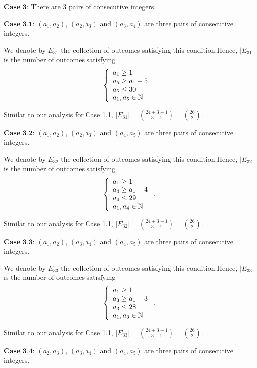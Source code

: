 \begin{enumerate}
 $\textbf{Case 3}$: There are 3 pairs of consecutive integers.

 $\textbf{Case 3.1}$: $\left( a_1 , a_2 \right)$, $\left( a_2 , a_3 \right)$ and $\left( a_3 , a_4 \right)$ are three pairs of consecutive integers.

 We denote by $E_{31}$ the collection of outcomes satisfying this condition.Hence, $| E_{31} |$ is the number of outcomes satisfying
 \[ \left\{ \begin{array}{l} a_1 \geq 1 \\ a_5 \geq a_1 + 5 \\ a_5 \leq 30 \\ a_1, a_5 \in \Bbb N \end{array} \right.. \]

 Similar to our analysis for Case 1.1,  $| E_{31} | = \binom{24 + 3 - 1}{3 - 1} = \binom{26}{2}$.

 $\textbf{Case 3.2}$: $\left( a_1 , a_2 \right)$, $\left( a_2 , a_3 \right)$ and $\left( a_4 , a_5 \right)$ are three pairs of consecutive integers.

 We denote by $E_{32}$ the collection of outcomes satisfying this condition.Hence, $| E_{32} |$ is the number of outcomes satisfying
 \[ \left\{ \begin{array}{l} a_1 \geq 1 \\ a_4 \geq a_1 + 4 \\ a_4 \leq 29 \\ a_1, a_4 \in \Bbb N \end{array} \right.. \]

 Similar to our analysis for Case 1.1,  $| E_{32} | = \binom{24 + 3 - 1}{3 - 1} = \binom{26}{2}$.

 $\textbf{Case 3.3}$: $\left( a_1 , a_2 \right)$, $\left( a_3 , a_4 \right)$ and $\left( a_4 , a_5 \right)$ are three pairs of consecutive integers.

 We denote by $E_{33}$ the collection of outcomes satisfying this condition.Hence, $| E_{33} |$ is the number of outcomes satisfying
 \[ \left\{ \begin{array}{l} a_1 \geq 1 \\ a_3 \geq a_1 + 3 \\ a_3 \leq 28 \\ a_1, a_3 \in \Bbb N \end{array} \right.. \]

 Similar to our analysis for Case 1.1,  $| E_{33} | = \binom{24 + 3 - 1}{3 - 1} = \binom{26}{2}$.

 $\textbf{Case 3.4}$: $\left( a_2 , a_3 \right)$, $\left( a_3 , a_4 \right)$ and $\left( a_4 , a_5 \right)$ are three pairs of consecutive integers.


\end{enumerate}
